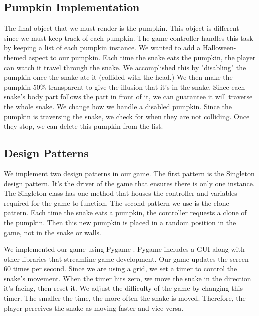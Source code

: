 \documentclass[sigplan,screen]{acmart}
\begin{document}
\subsection{Pumpkin Implementation}

The final object that we must render is the pumpkin. This object is different since we must keep track of each pumpkin. The game controller handles this task by keeping a list of each pumpkin instance. We wanted to add a Halloween-themed aspect to our pumpkin. Each time the snake eats the pumpkin, the player can watch it travel through the snake. We accomplished this by "disabling" the pumpkin once the snake ate it (collided with the head.) We then make the pumpkin 50\% transparent to give the illusion that it's in the snake. Since each snake's body part follows the part in front of it, we can guarantee it will traverse the whole snake. We change how we handle a disabled pumpkin. Since the pumpkin is traversing the snake, we check for when they are not colliding. Once they stop, we can delete this pumpkin from the list. 

\subsection{Design Patterns}
We implement two design patterns in our game. The first pattern is the Singleton design pattern. It's the driver of the game that ensures there is only one instance. The Singleton class has one method that houses the controller and variables required for the game to function. The second pattern we use is the clone pattern. Each time the snake eats a pumpkin, the controller requests a clone of the pumpkin. Then this new pumpkin is placed in a random position in the game, not in the snake or walls. 

We implemented our game using Pygame \cite{pygame}. Pygame includes a GUI along with other libraries that streamline game development. Our game updates the screen 60 times per second. Since we are using a grid, we set a timer to control the snake's movement. When the timer hits zero, we move the snake in the direction it's facing, then reset it. We adjust the difficulty of the game by changing this timer. The smaller the time, the more often the snake is moved. Therefore, the player perceives the snake as moving faster and vice versa.
\end{document}
